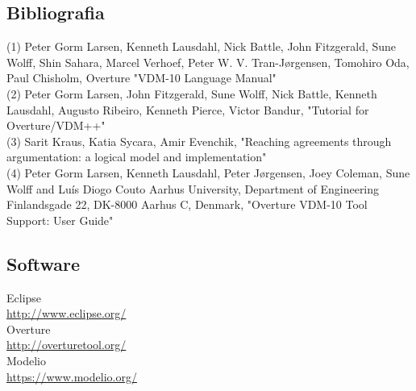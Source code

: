 \documentclass{article}
\begin{document}
\subsection{Bibliografia}
\noindent
(1) Peter Gorm Larsen, Kenneth Lausdahl, Nick Battle, John Fitzgerald, Sune Wolff, Shin Sahara, Marcel Verhoef, Peter W. V. Tran-Jørgensen, Tomohiro Oda, Paul Chisholm, Overture "VDM-10 Language Manual"\\

\noindent
(2) Peter Gorm Larsen, John Fitzgerald, Sune Wolff, Nick Battle, Kenneth Lausdahl, Augusto Ribeiro, Kenneth Pierce, Victor Bandur, "Tutorial for Overture/VDM++"\\

\noindent
(3) Sarit Kraus, Katia Sycara, Amir Evenchik, "Reaching agreements through argumentation: a logical model and implementation"\\

\noindent
(4) Peter Gorm Larsen, Kenneth Lausdahl, Peter Jørgensen, Joey Coleman, Sune Wolff and Luís Diogo Couto Aarhus University, Department of Engineering Finlandsgade 22, DK-8000 Aarhus C, Denmark, "Overture VDM-10 Tool Support: User Guide"\\
\subsection{Software}

Eclipse \\
\vspace{3mm}\url{http://www.eclipse.org/} \\
Overture \\
\vspace{3mm}\url{http://overturetool.org/} \\
Modelio \\
\vspace{3mm}\url{https://www.modelio.org/} \\
\end{document}
